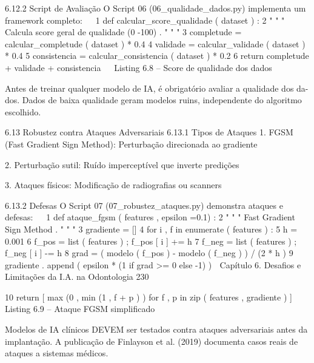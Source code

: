  6.12.2     Script de Avaliação
 O Script 06 (06_qualidade_dados.py) implementa um framework completo:
                                                                                                  
1 def calcular_score_qualidade ( dataset ) :
2     " " " Calcula score geral de qualidade (0 -100) . " " "
3     completude = calcular_completude ( dataset ) * 0.4
4     validade = calcular_validade ( dataset ) * 0.4
5     consistencia = calcular_consistencia ( dataset ) * 0.2
6     return completude + validade + consistencia
                                                                                                  
                         Listing 6.8 – Score de qualidade dos dados


     Antes de treinar qualquer modelo de IA, é obrigatório avaliar a qualidade dos da-
     dos. Dados de baixa qualidade geram modelos ruins, independente do algoritmo
     escolhido.


 6.13       Robustez contra Ataques Adversariais
 6.13.1     Tipos de Ataques
     1. FGSM (Fast Gradient Sign Method): Perturbação direcionada ao gradiente

     2. Perturbação sutil: Ruído imperceptível que inverte predições

     3. Ataques físicos: Modificação de radiografias ou scanners

 6.13.2     Defesas
 O Script 07 (07_robustez_ataques.py) demonstra ataques e defesas:
                                                                                                  
1 def ataque_fgsm ( features , epsilon =0.1) :
2     " " " Fast Gradient Sign Method . " " "
3     gradiente = []
4     for i , f in enumerate ( features ) :
5            h = 0.001
6            f_pos = list ( features ) ; f_pos [ i ] += h
7            f_neg = list ( features ) ; f_neg [ i ] -= h
8            grad = ( modelo ( f_pos ) - modelo ( f_neg ) ) / (2 * h )
9            gradiente . append ( epsilon * (1 if grad >= 0 else -1) )
     Capítulo 6. Desafios e Limitações da I.A. na Odontologia                                230


10        return [ max (0 , min (1 , f + p ) ) for f , p in zip ( features , gradiente ) ]
                                                                                                  
                               Listing 6.9 – Ataque FGSM simplificado


         Modelos de IA clínicos DEVEM ser testados contra ataques adversariais antes
         da implantação. A publicação de Finlayson et al. (2019) documenta casos reais
         de ataques a sistemas médicos.


